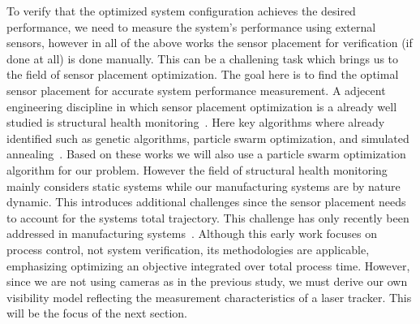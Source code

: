 \documentclass{svproc}
\begin{document}
To verify that the optimized system configuration achieves the desired performance, we need to measure the system's performance using external sensors, 
however in all of the above works the sensor placement for verification (if done at all) is done manually.
This can be a challening task which brings us to the field of sensor placement optimization.
The goal here is to find the optimal sensor placement for accurate system performance measurement.
A adjecent engineering discipline in which sensor placement optimization is a already well studied is structural health monitoring~\cite{shms}.
Here key algorithms where already identified such as genetic algorithms, particle swarm optimization, and simulated annealing~\cite{shms}.
Based on these works we will also use a particle swarm optimization algorithm for our problem.
However the field of structural health monitoring mainly considers static systems while our manufacturing systems are by nature dynamic.
This introduces additional challenges since the sensor placement needs to account for the systems total trajectory.
This challenge has only recently been addressed in manufacturing systems~\cite{ieee_sensors}. Although this early work focuses on process control, not system verification, its methodologies are applicable, 
emphasizing optimizing an objective integrated over total process time. 
However, since we are not using cameras as in the previous study, we must derive our own visibility model reflecting the measurement characteristics of a laser tracker.
This will be the focus of the next section.
\end{document}

